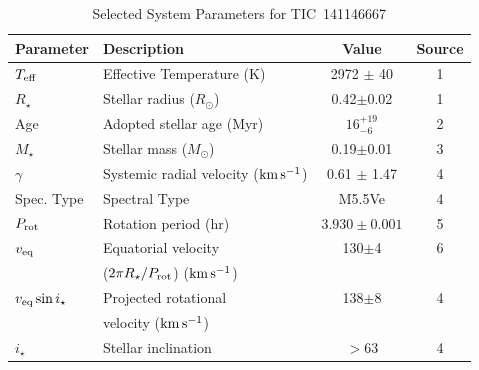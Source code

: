 \documentclass{nature3}
\newcommand{\kms}{\ensuremath{\rm km\,s^{-1}}}
\begin{document}
\begin{table}
\scriptsize
\setlength{\tabcolsep}{2pt}
\centering
\caption{Selected System Parameters for TIC~141146667}
\label{tab:params}
\begin{tabular}{llcc}
\hline \hline
Parameter & Description & Value & Source\\
\hline 
%
$T_{\rm eff}$\dotfill                   & Effective Temperature (K) \hspace{9pt}\dotfill                 & 2972 $\pm$ 40    & 1 \\
%
%
$R_\star$\dotfill                       & Stellar radius ($R_\odot$)\dotfill                             & 0.42$\pm$0.02    & 1 \\
%
Age                                     & Adopted stellar age (Myr)\dotfill                              & $16^{+19}_{-6}$  & 2 \\
%
$M_\star$\dotfill                       & Stellar mass ($M_\odot$)\dotfill                               & 0.19$\pm$0.01  & 3 \\
%
$\gamma$\dotfill                        & Systemic radial velocity (\kms)\dotfill                        & 0.61 $\pm$ 1.47  & 4 \\
%
Spec. Type\dotfill                      & Spectral Type\dotfill                                          & M5.5Ve           & 4 \\
%
$P_{\rm rot}$\dotfill                   & Rotation period (hr)\dotfill                                   & $3.930\pm 0.001$ & 5 \\
%
$v_{\rm eq}$\dotfill		                & Equatorial velocity \dotfill                                   &  130$\pm$4       & 6 \\
                                        & \hspace{3pt} ($2\pi R_\star/P_{\rm rot}$) (\kms)	             &                      \\
%
$v_{\rm eq}\sin{i_\star}$\dotfill		    & Projected rotational\dotfill                                   &  138$\pm$8       & 4 \\
                                        & \hspace{3pt} velocity (\kms)	                                 &                      \\
%
$i_\star$\dotfill                       & Stellar inclination\dotfill                                    & 	$>$63           & 4 \\

\end{tabular}
\end{table}
\end{document}
